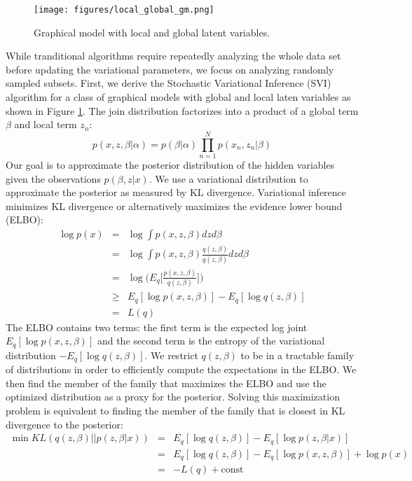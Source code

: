 \begin{figure}[tbhp]
    \centering
    \texttt{[image: figures/local\_global\_gm.png]}
    \caption{Graphical model with local and global latent variables.}
    \label{fig:svi_gm}
\end{figure}

While tranditional algorithms require repeatedly analyzing the whole data set before updating the variational parameters, we focus on analyzing randomly sampled subsets. First, we derive the Stochastic Variational Inference (SVI) algorithm for a class of graphical models with global and local laten variables as shown in Figure \ref{fig:svi_gm}. The join distribution factorizes into a product of a global term $\beta$ and local term $z_n$:
\begin{equation}
    p(x,z,\beta|\alpha) = p(\beta|\alpha)\prod_{n=1}^{N}p(x_n,z_n|\beta)
\end{equation}
Our goal is to approximate the posterior distribution of the hidden variables given the observations $p(\beta,z|x)$. We use a variational distribution to approximate the posterior as measured by KL divergence. Variational inference minimizes KL divergence or alternatively maximizes the evidence lower bound (ELBO):
\begin{eqnarray}
    \log p(x) &=& \log \int p(x,z,\beta) dz d\beta \\
              &=& \log \int p(x,z,\beta) \frac{q(z,\beta)}{q(z,\beta)} dz d\beta \\
              &=& \log \bigg(E_q \bigg[\frac{p(x,z,\beta)}{q(z,\beta)} \bigg] \bigg) \\
              &\geq& E_q[\log p(x,z,\beta)] - E_q[\log q(z,\beta)]\\
              &=& L(q)
\end{eqnarray}
The ELBO contains two terms: the first term is the expected log joint $E_q[\log p(x,z,\beta)]$ and the second term is the entropy of the variational distribution $- E_q[\log q(z,\beta)]$. We restrict $q(z,\beta)$ to be in a tractable family of distributions in order to efficiently compute the expectations in the ELBO. We then find the member of the family that maximizes the ELBO and use the optimized distribution as a proxy for the posterior. Solving this maximization problem is equivalent to finding the member of the family that is closest in KL divergence to the posterior:
\begin{eqnarray}
    \min KL(q(z,\beta)||p(z,\beta|x)) &=& E_q[\log q(z,\beta)] - E_q[\log p(z,\beta|x)] \\
    &=& E_q[\log q(z,\beta)] - E_q[\log p(x,z,\beta)] + \log p(x) \\
    &=& -L(q) + \mathrm{const}
\end{eqnarray}
